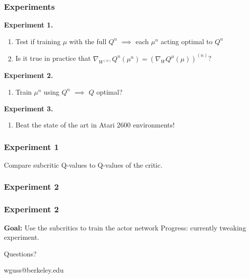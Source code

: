 \documentclass{beamer}
\numberwithin{equation}{subsection}
\numberwithin{theorem}{subsection}
\begin{document}
\begin{frame}
  \frametitle{Experiments}
  \textbf{Experiment 1.}
  \begin{enumerate}
    \item Test if training $\mu$ with the full $Q^n$ $\implies$ each $\mu^n$ acting optimal to $Q^n$
    \item Is it true in practice that $\nabla_{W^{(n)}} Q^{n}(\mu^n) = \left(\nabla_{W} Q^\mu(\mu)\right)^{(n)}$?
  \end{enumerate}
    \textbf{Experiment 2.}
    \begin{enumerate}
      \item Train $\mu^n$ using $Q^n$ $\implies$ $Q$ optimal?
    \end{enumerate}
        \textbf{Experiment 3.}
    \begin{enumerate}
      \item Beat the state of the art in Atari 2600 environments!
    \end{enumerate}
\end{frame}

\begin{frame}
    \frametitle{Experiment 1}
    Compare subcritic Q-values to Q-values of the critic.
\end{frame}
\begin{frame}
    \frametitle{Experiment 2}
\end{frame}
\begin{frame}
    \frametitle{Experiment 2}
    \textbf{Goal:} Use the subcritics to train the actor network
    Progress: currently tweaking experiment.
\end{frame}

\begin{frame}
\Huge{\centerline{Questions?}}
\Small\centerline{wguss@berkeley.edu}
\end{frame}

\end{document}
